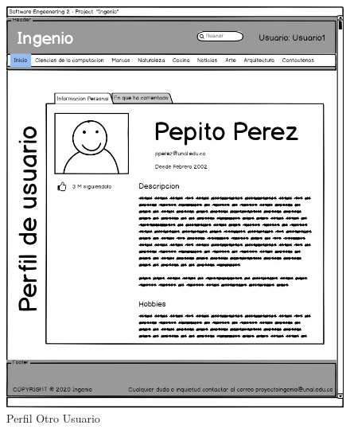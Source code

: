 \documentclass[a4paper,12 pt]{article}
\begin{document}
\begin{figure}[H]
    \centering
    \includegraphics[scale = 1.3]{images/PerfilOtroUsuario.jpg}
    \caption{Perfil Otro Usuario}
    \label{F106}
\end{figure}{}
\end{document}
